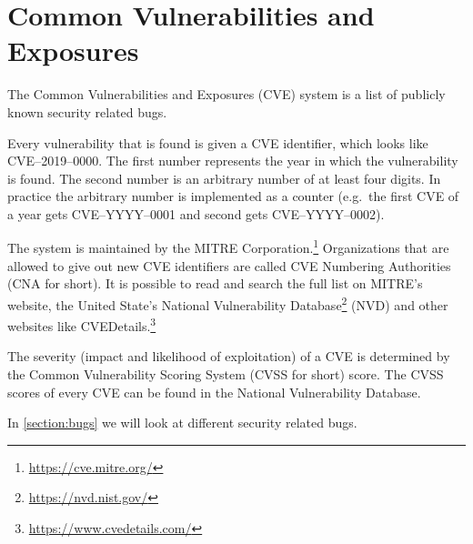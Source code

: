 \section{Common Vulnerabilities and Exposures}
The Common Vulnerabilities and Exposures (CVE) system is a list of publicly known security related bugs.

Every vulnerability that is found is given a CVE identifier, which looks like CVE--2019--0000. The first number represents the year in which the vulnerability is found. The second number is an arbitrary number of at least four digits. In practice the arbitrary number is implemented as a counter (e.g.\ the first CVE of a year gets CVE--YYYY--0001 and second gets CVE--YYYY--0002).

The system is maintained by the MITRE Corporation.\footnote{\url{https://cve.mitre.org/}} Organizations that are allowed to give out new CVE identifiers are called CVE Numbering Authorities (CNA for short). It is possible to read and search the full list on MITRE's website, the United State's National Vulnerability Database\footnote{\url{https://nvd.nist.gov/}} (NVD) and other websites like CVEDetails.\footnote{\url{https://www.cvedetails.com/}}

\medskip

The severity (impact and likelihood of exploitation) of a CVE is determined by the Common Vulnerability Scoring System (CVSS for short) score. The CVSS scores of every CVE can be found in the National Vulnerability Database.

\medskip

In \autoref{section:bugs} we will look at different security related bugs.
